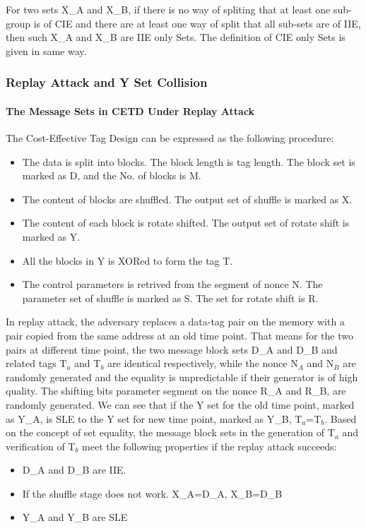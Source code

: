\documentclass{article}
\begin{document}
For two sets X\_A and X\_B, if there is no way of spliting that at least one sub-group is of CIE and there are at least one way of split that all sub-sets are of IIE, then such X\_A and X\_B are IIE only Sets. 
The definition of CIE only Sets is given in same way.

\subsubsection{Replay Attack and Y Set Collision}
\paragraph{The Message Sets in CETD Under Replay Attack}
The Cost-Effective Tag Design can be expressed as the following procedure:
\begin{itemize}
	\item The data is split into blocks. The block length is tag length. The block set is marked as D, and the No. of blocks is M.
	\item The content of blocks are shuffled. The output set of shuffle is marked as X.
	\item The content of each block is rotate shifted. The output set of rotate shift is marked as Y.
	\item All the blocks in Y is XORed to form the tag T.
	\item The control parameters is retrived from the segment of nonce N. The parameter set of shuffle is marked as S. The set for rotate shift is R.
\end{itemize}

In replay attack, the adversary replaces a data-tag pair on the memory with a
pair copied from the same address at an old time point. That means for the two
pairs at different time point, the two message block sets D\_A and D\_B and related tags T$_a$ and T$_b$ are
identical respectively, while the nonce N$_A$ and N$_B$ are randomly generated and
the equality is unpredictable if their generator is of high quality. The shifting bits parameter segment on the nonce R\_A and R\_B, are randomly
generated.
We can see that if the Y set for the old time point, marked as Y\_A, is SLE to the Y set for new time point, marked as Y\_B, T$_a$=T$_b$.
Based on the concept of set equality, the message block sets in the generation of T$_a$ and verification of T$_b$ meet the following properties if the replay attack succeeds:
\begin{itemize}
	\item D\_A and D\_B are IIE.
	\item If the shuffle stage does not work. X\_A=D\_A, X\_B=D\_B
	\item Y\_A and Y\_B are SLE
\end{itemize}
\end{document}
